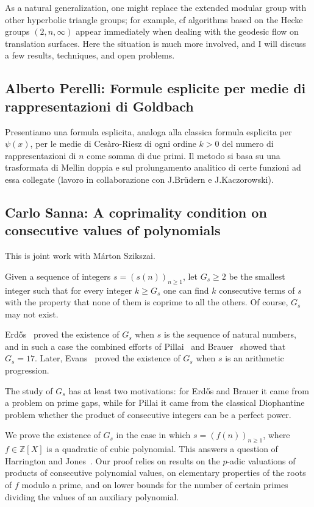 \documentclass[15pt]{article}
\begin{document}
As a natural generalization, one might replace the extended modular group with other hyperbolic triangle groups; for example, cf algorithms based on the Hecke groups $(2,n,\infty)$ appear immediately when dealing with the geodesic flow on translation surfaces. Here the situation is much more involved, and I will discuss a few results, techniques, and open problems.

\subsection*{Alberto Perelli: Formule esplicite per medie di rappresentazioni di Goldbach}

Presentiamo una formula esplicita, analoga alla classica formula esplicita per $\psi(x)$, per le medie di Ces\`aro-Riesz di ogni ordine $k>0$ del numero di rappresentazioni di $n$ come somma di due primi. Il metodo si basa su una trasformata di Mellin doppia e sul prolungamento analitico di certe funzioni ad essa collegate (lavoro in collaborazione con J.Br\"udern e J.Kaczorowski).

\subsection*{Carlo Sanna: A coprimality condition on consecutive values of polynomials}

This is joint work with M{\'a}rton Szikszai.
\vspace{0.3em}

Given a sequence of integers $s=(s(n))_{n \geq 1}$, let $G_s \geq 2$ be the smallest integer such that for every integer $k\geq G_s$ one can find $k$ consecutive terms of $s$ with the property that none of them is coprime to all the others.
Of course, $G_s$ may not exist.

Erd\H{o}s~\cite{erdos} proved the existence of $G_s$ when $s$ is the sequence of natural numbers, and in such a case the combined efforts of Pillai~\cite{MR0001226, MR0001747} and Brauer~\cite{MR0003638} showed that $G_s=17$.
Later, Evans~\cite{MR0319867} proved the existence of $G_s$ when $s$ is an arithmetic progression.

The study of $G_s$ has at least two motivations: for Erd\H{o}s and Brauer it came from a problem on prime gaps, while for Pillai it came from the classical Diophantine problem whether the product of consecutive integers can be a perfect power.

We prove the existence of $G_s$ in the case in which $s = (f(n))_{n \geq 1}$, where $f \in \mathbb{Z}[X]$ is a quadratic of cubic polynomial.
This answers a question of Harrington and Jones~\cite{MR3361816}.
Our proof relies on results on the $p$-adic valuations of products of consecutive polynomial values, on elementary properties of the roots of $f$ modulo a prime, and on lower bounds for the number of certain primes dividing the values of an auxiliary polynomial.
\end{document}
